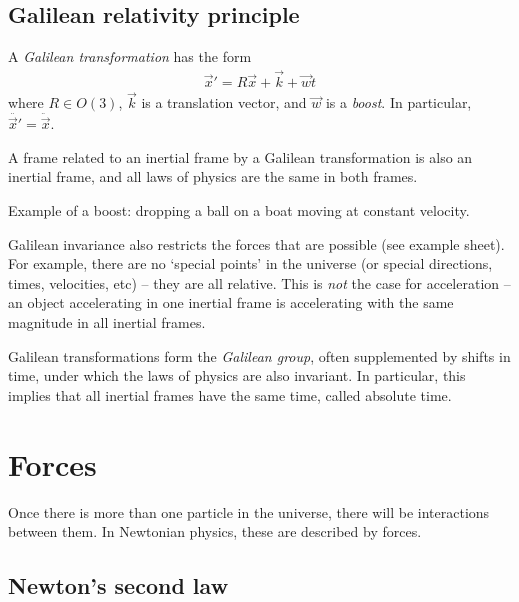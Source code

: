 \documentclass{../../template/note}
\begin{document}
    \subsection{Galilean relativity principle}
    
    \begin{definition}
        A \emph{Galilean transformation} has the form
        \begin{align*}
            \vec x' = R \vec x + \vec k + \vec w t
        \end{align*}
        where \(R \in O(3)\), \(\vec k\) is a translation vector, and \(\vec w\) is a \emph{boost}. In particular, \(\ddot{\vec x'} = \ddot{\vec x}\).
    \end{definition}

    \begin{proposition}
        A frame related to an inertial frame by a Galilean transformation is also an inertial frame, and all laws of physics are the same in both frames.
    \end{proposition}
    
    Example of a boost: dropping a ball on a boat moving at constant velocity.

    Galilean invariance also restricts the forces that are possible (see example sheet). For example, there are no `special points' in the universe (or special directions, times, velocities, etc) -- they are all relative. This is \emph{not} the case for acceleration -- an object accelerating in one inertial frame is accelerating with the same magnitude in all inertial frames.

    Galilean transformations form the \emph{Galilean group}, often supplemented by shifts in time, under which the laws of physics are also invariant. In particular, this implies that all inertial frames have the same time, called absolute time.

    \section{Forces}

    Once there is more than one particle in the universe, there will be interactions between them. In Newtonian physics, these are described by forces.

    \subsection{Newton's second law}
\end{document}
